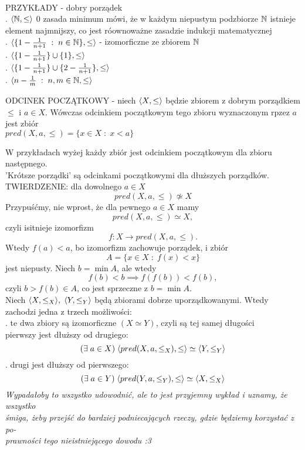\bigskip\\
{\color{acc}PRZYKŁADY} - dobry porządek\medskip\\
. $\langle\mathbb{N},\leq\rangle$ 0 zasada minimum mówi, że w każdym niepustym podzbiorze $\mathbb{N}$ istnieje element najmnijszy, co jest róownoważne zasadzie indukcji matematycznej\smallskip\\
. $\langle \{1-\frac1{n+1}\;:\;n\in\mathbb{N}\}, \leq\rangle$ - izomorficzne ze zbiorem $\mathbb{N}$\smallskip\\
. $\langle \{1-\frac 1{n+1}\}\cup\{1\}, \leq\rangle$\smallskip\\
. $\langle \{1-\frac 1{n+1}\}\cup\{2-\frac 1{n+1}\}, \leq\rangle$\smallskip\\
. $\langle n-\frac1m\;:\;n,m\in\mathbb{N},\leq\rangle$\bigskip\\
\bigskip
\begin{center}
    {\color{def}ODCINEK POCZĄTKOWY} - niech $\langle X,\leq\rangle$ będzie zbiorem z dobrym porządkiem $\leq$ i $a\in X$. Wówczas odcinkiem początkowym tego zbioru wyznaczonym rpzez $a$ jest zbiór\smallskip\\
    $pred(X, a,\leq)=\{x\in X\;:\;x<a\}$
\end{center}
W przykładach wyżej każdy zbiór jest odcinkiem początkowym dla zbioru następnego. \\'Krótsze porządki' są odcinkami początkowymi dla dłuższych porządków.\bigskip\\
{\large\color{acc}TWIERDZENIE:} dla dowolnego $a\in X$
$$pred(X, a, \leq)\not\simeq X$$
\dowod
Przypuśćmy, nie wprost, że dla pewnego $a\in X$ mamy
$$pred(X, a,\leq)\simeq X,$$
czyli isitnieje izomorfizm
$$f:X\to pred(X, a,\leq).$$
Wtedy $f(a)<a$, bo izomorfizm zachowuje porządek, i zbiór
$$A=\{x\in X\;:\;f(x)<x\}$$
jest niepusty. Niech $b=\min A$, ale wtedy
$$f(b)<b\implies f(f(b))<f(b),$$
czyli $b>f(b)\in A$, co jest sprzeczne z $b=\min A$.
\kondow
{}\bigskip\\
Niech $\langle X, \leq_X\rangle,\;\langle Y,\leq_Y\rangle$ będą zbiorami dobrze uporządkowanymi. Wtedy zachodzi jedna z trzech możliwości:\smallskip\\
. te dwa zbiory są {\color{acc}izomorficzne} $(X\simeq Y)$, czyli są tej samej długości\smallskip\\
\indent pierwszy jest dłuższy od drugiego:
$$(\exists\;a\in X)\;\langle pred(X, a, \leq_X), \leq\rangle\simeq \langle Y,\leq_Y\rangle$$
. drugi jest dłuższy od pierwszego:
$$(\exists\;a\in Y)\;\langle pred (Y, a, \leq_Y), \leq\rangle\simeq \langle X, \leq_X\rangle$$
\emph{Wypadałoby to wszystko udowodnić, ale to jest przyjemny wykład i uznamy, że wszystko \\śmiga, żeby przejść do bardziej podniecających rzeczy, gdzie będziemy korzystać z po-\\prawności tego nieistniejącego dowodu :3}
